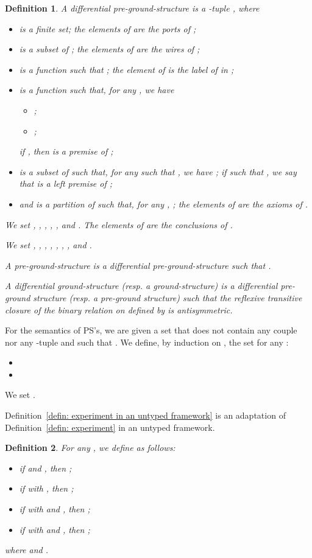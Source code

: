 \documentclass{article}
\theoremstyle{plain}
\newtheorem{definition}{Definition}
\begin{document}
\begin{definition}\label{defin: diff pre-ground-structure}
A \emph{differential pre-ground-structure} is a -tuple , where
\begin{itemize}
\item  is a finite set; the elements of  are the \emph{ports of };
\item  is a subset of ; the elements of  are the \emph{wires of };
\item  is a function  such that ; the element  of  is the \emph{label of  in };
\item  is a function  such that, for any , we have
\begin{itemize}
\item ;
\item ;
\end{itemize}
if , then  is a \emph{premise of };
\item  is a subset of  such that, for any  such that , we have ; if  such that , we say that  is a \emph{left premise of ;}
\item and  is a partition of  such that, for any , ; the elements of  are the \emph{axioms of }.
\end{itemize}
We set , , , , ,  and . The elements of  are the \emph{conclusions of }.

We set , , 
, , , 
, ,  and .


A \emph{pre-ground-structure} is a differential pre-ground-structure  such that .

A \emph{differential ground-structure} (resp. a \emph{ground-structure}) is a differential pre-ground structure (resp. a pre-ground structure)  such that the reflexive transitive closure  of the binary relation  on  defined by  is antisymmetric.
\end{definition}

For the semantics of PS's, we are given a set  that does not contain any couple nor any -tuple and such that . We define, by induction on , the set  for any :
\begin{itemize}
\item 
\item 
\end{itemize}
We set .

Definition~\ref{defin: experiment in an untyped framework} is an adaptation of Definition~\ref{defin: experiment} in an untyped framework.

\begin{definition}
For any , we define  as follows:
\begin{itemize}
\item if  and , then ;
\item if  with , then ;
\item if  with  and , then ;
\item if  with  and , then ;
\end{itemize}
where  and .
\end{definition}
\end{document}

